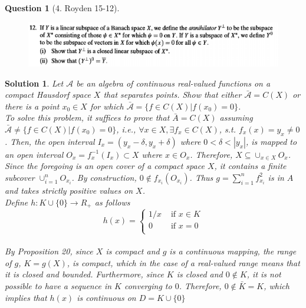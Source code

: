 \documentclass{article} %
\theoremstyle{quest}
\newtheorem*{question}{Question}
\newtheorem*{solution}{Solution}
\begin{document}
\begin{question}[4. Royden 15-12]
\hfill
\begin{figure}[h!]
  \centering
    \includegraphics[width=1\textwidth]{15-12.png}
\end{figure}
\end{question}
\begin{solution}
\textit{Let $\mathcal{A}$ be an algebra of continuous real-valued functions on a compact Hausdorf space $X$ that separates points. Show that either $\bar {\mathcal{A}}=C(X)$ or there is a point $x_0 \in X$ for which $\bar{\mathcal{A}}=\{f \in C(X)|f(x_0)=0\}$}.  \\ 

To solve this problem, it suffices to prove that $\bar{A}=C(X)$ assuming $\bar{\mathcal{A}}\neq \{f \in C(X)|f(x_0)=0\}$, i.e.,  $\forall x \in X, \exists f_x\in C(X)$, s.t.  $f_x(x) =y_x\neq 0$. Then, the open interval $I_x=(y_x-\delta, y_x+ \delta)$ where $0<\delta<|y_x|$, is mapped to an open interval $O_x=f_x^{-1}(I_x) \subset X$ where $x \in O_x$.   Therefore, $X\subseteq \cup_{x \in X}O_x$. Since the foregoing is an open cover of a compact space $X$,  it contains a finite subcover      $\cup_{i=1}^nO_{x_i}$.  By construction, $0 \notin f_{x_i}(O_{x_i})$. Thus $g=\sum_{i=1}^n f^2_{x_i}$ is in $A$ and takes strictly positive values on $X$.  \\ 

Define $h:K\cup\{0\}\rightarrow R_+$ as follows\\
$$h(x)=\begin{cases}
1/x & \text{ if } x \in K\\
0 & \text{ if } x =0\\
\end{cases}$$\\  

By Proposition 20, since $X$ is compact and $g$ is a continuous mapping, the range of $g$, $K=g(X)$, is compact, which in the case of a real-valued range means that it is closed and bounded. Furthermore, since $K$ is closed and $0\notin K$, it is not possible to have a  sequence in $K$ converging to $0$. Therefore, $0 \notin \bar{K}=K$, which implies that  $h(x)$ is continuous on $D=K\cup\{0\}$\\


\end{solution}
\end{document}
